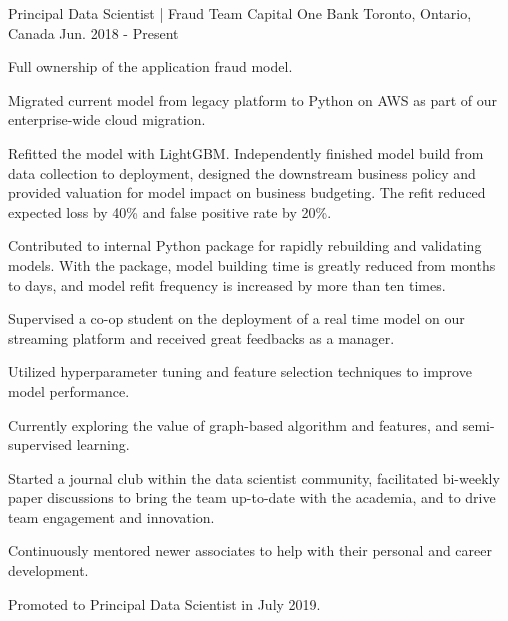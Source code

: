 

\begin{cventries}

  \cventry
    {Principal Data Scientist | Fraud Team} %
    {Capital One Bank} %
    {Toronto, Ontario, Canada} %
    {Jun. 2018 - Present} %
    {
      \begin{cvitems} %
        \item {Full ownership of the application fraud model.}\\
        \begin{cvitems}
          \item {Migrated current model from legacy platform to Python on AWS as part of our enterprise-wide cloud migration.}
          \item {Refitted the model with LightGBM. Independently finished model build from data collection to deployment, designed the downstream business policy and provided valuation for model impact on business budgeting. The refit reduced expected loss by 40\% and false positive rate by 20\%.}
          \item {Contributed to internal Python package for rapidly rebuilding and validating models. With the package, model building time is greatly reduced from months to days, and model refit frequency is increased by more than ten times.}
          \item {Supervised a co-op student on the deployment of a real time model on our streaming platform and received great feedbacks as a manager.}
          \item {Utilized hyperparameter tuning and feature selection techniques to improve model performance.}
          \item {Currently exploring the value of graph-based algorithm and features, and semi-supervised learning.}\\
        \end{cvitems}
        \item {Started a journal club within the data scientist community, facilitated bi-weekly paper discussions to bring the team up-to-date with the academia, and to drive team engagement and innovation.}
        \item {Continuously mentored newer associates to help with their personal and career development.}
        \item {Promoted to Principal Data Scientist in July 2019.}
      \end{cvitems}
    }


\end{cventries}
